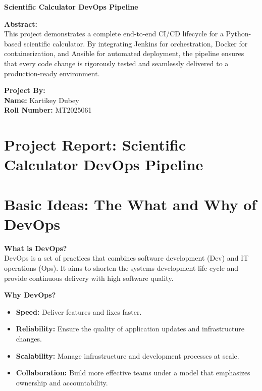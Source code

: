 \documentclass[12pt,a4paper]{article}
\begin{document}
\begin{titlepage}
\thispagestyle{empty}
\begin{center}
\vspace*{3cm}
{\LARGE \textbf{Scientific Calculator DevOps Pipeline}\par}

\vspace{2cm}

\textbf{Abstract:}\\[0.5cm]
This project demonstrates a complete end-to-end CI/CD lifecycle for a Python-based scientific calculator.
By integrating Jenkins for orchestration, Docker for containerization, and Ansible for automated deployment,
the pipeline ensures that every code change is rigorously tested and seamlessly delivered to a production-ready environment.

\vfill

\begin{flushright}
\textbf{Project By:}\\[0.5cm]
\textbf{Name:} Kartikey Dubey\\
\textbf{Roll Number:} MT2025061
\end{flushright}

\end{center}
\end{titlepage}



\section*{Project Report: Scientific Calculator DevOps Pipeline}

\section{Basic Ideas: The What and Why of DevOps}

\textbf{What is DevOps?}\\
DevOps is a set of practices that combines software development (Dev) and IT operations (Ops). It aims to shorten the systems development life cycle and provide continuous delivery with high software quality.

\vspace{0.5em}
\textbf{Why DevOps?}
\begin{itemize}[noitemsep]
  \item \textbf{Speed:} Deliver features and fixes faster.
  \item \textbf{Reliability:} Ensure the quality of application updates and infrastructure changes.
  \item \textbf{Scalability:} Manage infrastructure and development processes at scale.
  \item \textbf{Collaboration:} Build more effective teams under a model that emphasizes ownership and accountability.
\end{itemize}
\end{document}
